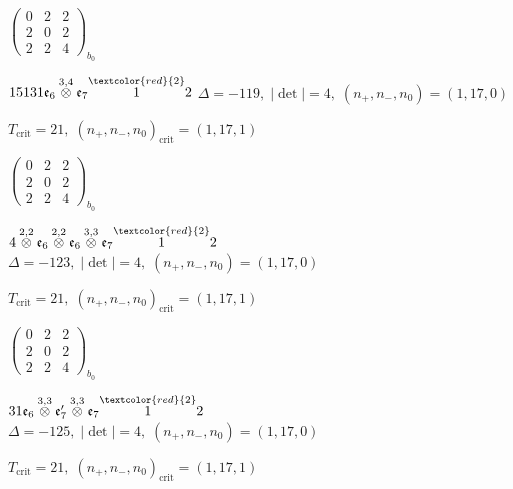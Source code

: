 \documentclass[10pt]{article}
\begin{document}
\hspace{2em}$\left(\begin{smallmatrix}0 & 2 & 2 \\ 2 & 0 & 2 \\ 2 & 2 & 4\end{smallmatrix}\right)_{\!b_0}$

\smallskip

$15131\mathfrak{e}_6\overset{3,4}{\otimes}\mathfrak{e}_7\overset{\textcolor{red}{2}}{1}2$ \quad $\Delta=-119,\; |\det|=4,\; (n_+,n_-,n_0)=(1,17,0)$

\hspace{1em}$T_{\text{crit}}=21,\; (n_+,n_-,n_0)_{\text{crit}}=(1,17,1)$

\hspace{2em}$\left(\begin{smallmatrix}0 & 2 & 2 \\ 2 & 0 & 2 \\ 2 & 2 & 4\end{smallmatrix}\right)_{\!b_0}$

\smallskip

$4\overset{2,2}{\otimes}\mathfrak{e}_6\overset{2,2}{\otimes}\mathfrak{e}_6\overset{3,3}{\otimes}\mathfrak{e}_7\overset{\textcolor{red}{2}}{1}2$ \quad $\Delta=-123,\; |\det|=4,\; (n_+,n_-,n_0)=(1,17,0)$

\hspace{1em}$T_{\text{crit}}=21,\; (n_+,n_-,n_0)_{\text{crit}}=(1,17,1)$

\hspace{2em}$\left(\begin{smallmatrix}0 & 2 & 2 \\ 2 & 0 & 2 \\ 2 & 2 & 4\end{smallmatrix}\right)_{\!b_0}$

\smallskip

$31\mathfrak{e}_6\overset{3,3}{\otimes}\mathfrak{e}_7'\overset{3,3}{\otimes}\mathfrak{e}_7\overset{\textcolor{red}{2}}{1}2$ \quad $\Delta=-125,\; |\det|=4,\; (n_+,n_-,n_0)=(1,17,0)$

\hspace{1em}$T_{\text{crit}}=21,\; (n_+,n_-,n_0)_{\text{crit}}=(1,17,1)$
\end{document}
